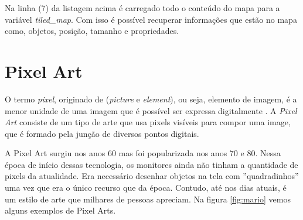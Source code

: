 \clearpage


Na linha (7) da listagem acima é carregado todo o conteúdo do mapa para a variável \textit{tiled\_map}. Com isso é possível recuperar informações que estão no mapa como, objetos, posição, tamanho e propriedades. 


\section{Pixel Art}
\label{sec:pixel-art}
O termo \textit{pixel}, originado de (\textit{picture} e \textit{element}), ou seja, elemento de imagem, é a menor unidade de uma imagem que é possível ser expressa digitalmente \cite{lyon2006brief}. A \textit{Pixel Art} consiste de um tipo de arte que usa pixels visíveis para compor uma image, que é formado pela junção de diversos pontos digitais. 

A Pixel Art surgiu nos anos 60 mas foi popularizada nos anos 70 e 80. Nessa época de início dessas tecnologia, os monitores ainda não tinham a quantidade de pixels da atualidade. Era necessário desenhar objetos na tela com ''quadradinhos'' uma vez que era o único recurso que da época. Contudo, até nos dias atuais, é um estilo de arte que milhares de pessoas apreciam. Na figura \ref{fig:mario} vemos alguns exemplos de Pixel Arts.



